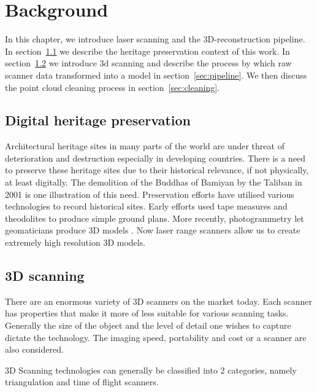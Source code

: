 \chapter{Background} \label{ch:background}

In this chapter, we introduce laser scanning and the 3D-reconstruction pipeline. In section~\ref{sec:heritage} we describe the heritage preservation context of this work. In section~\ref{sec:scanners} we introduce 3d scanning and describe the process by which raw scanner data transformed into a model in section~\ref{sec:pipeline}. We then discuss the point cloud cleaning process in section~\ref{sec:cleaning}.


\section{Digital heritage preservation} \label{sec:heritage}

Architectural heritage sites in many parts of the world are under threat of deterioration and destruction especially in developing countries. There is a need to preserve these heritage sites due to their historical relevance, if not physically, at least digitally. The demolition of  the Buddhas of Bamiyan by the Taliban in 2001 \cite{Toubekis2009} is one illustration of this need. Preservation efforts have utilised various technologies to record historical sites. Early efforts used tape measures and theodolites to produce simple ground plans.  More recently, photogrammetry let geomaticians produce 3D models \cite{Heritage}. Now laser range scanners allow us to create extremely high resolution 3D models.


\section{3D scanning} \label{sec:scanners}

There are an enormous variety of 3D scanners on the market today. Each scanner has properties that make it more of less suitable for various scanning tasks. Generally the size of the object and the level of detail one wishes to capture dictate the technology. The imaging speed, portability and cost or a scanner are also considered.

3D Scanning technologies can generally be classified into 2 categories, namely triangulation and time of flight scanners.

